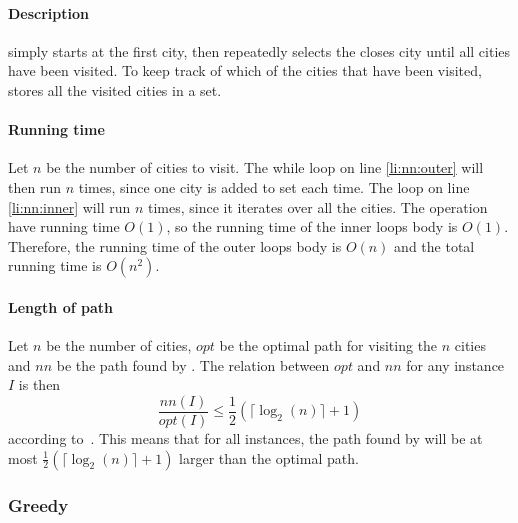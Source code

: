 \paragraph{Description}  simply starts at the first 
city, then repeatedly selects the closes city until all cities have been
visited. To keep track of which of the cities that have been visited,
 stores all the visited cities in a set.
\paragraph{Running time}
Let $n$ be the number of cities to visit. The while loop on line
\ref{li:nn:outer} will then run $n$ times, since one city is added to set
 each time. The loop on line \ref{li:nn:inner} will run $n$ times,
since it iterates over all the cities. The  operation have
running time $O(1)$, so the running time of the inner loops body is $O(1)$.
Therefore, the running time of the outer loops body is $O(n)$ and the total
running time is $O(n^2)$.
\paragraph{Length of path}
Let $n$ be the number of cities, $opt$ be the optimal path for visiting the $n$
cities and $nn$ be the path
found by . The relation between $opt$ and $nn$ for any instance $I$ is then
\[\frac{nn(I)}{opt(I)} \leq \frac{1}{2}(\lceil \log_2(n) \rceil + 1)\]
according to~\cite{johnson}. This means that for all instances, the path found
by  will be at most 
$\frac{1}{2}(\lceil \log_2(n) \rceil + 1)$ larger than the optimal path.

\clearpage

\subsubsection{Greedy}
